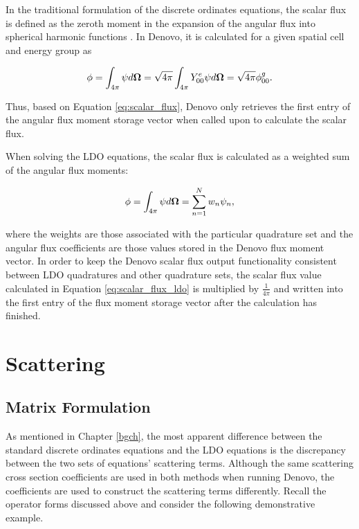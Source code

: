 In the traditional formulation of the discrete ordinates equations, the scalar flux is
defined as the zeroth moment in the expansion of the angular flux into spherical harmonic
functions \cite{exmm}. In Denovo, it is calculated for a given spatial cell and energy group as

\begin{equation}
\phi = \int_{4\pi}\psi d\mathbf\Omega = \sqrt{4\pi}\int_{4\pi}Y_{00}^{e}\psi d\mathbf\Omega
     = \sqrt{4\pi}\phi^g_{00}.
\label{eq:scalar_flux}
\end{equation}

\noindent Thus, based on Equation \ref{eq:scalar_flux}, Denovo only retrieves the first
entry of the angular flux moment storage vector when called upon to calculate the 
scalar flux.

When solving the LDO equations, the scalar flux is calculated as a 
weighted sum of the angular flux moments:

\begin{equation}
\phi = \int_{4\pi}\psi d\mathbf\Omega = \sum_{n=1}^{N}w_n\psi_n,
\label{eq:scalar_flux_ldo}
\end{equation}

\noindent where the weights are those associated with the particular
quadrature set and the angular flux coefficients are those values stored in the Denovo
flux moment vector. In order to keep the Denovo scalar flux output 
functionality consistent between LDO quadratures and other quadrature sets, the scalar
flux value calculated in Equation \ref{eq:scalar_flux_ldo} is multiplied by 
$\tfrac{1}{4\pi}$ and written into the first entry of the flux moment storage
vector after the calculation has finished.

\section{Scattering}
\subsection{Matrix Formulation}
\label{sec:scatter}

As mentioned in Chapter \ref{bgch}, the most apparent difference between the 
standard discrete ordinates equations and the LDO equations is the discrepancy between
the two sets of equations' scattering terms. Although the same scattering cross section
coefficients are used in both methods when running Denovo, the coefficients are used
to construct the scattering terms differently. Recall the operator forms discussed 
above and consider the following demonstrative example. 

